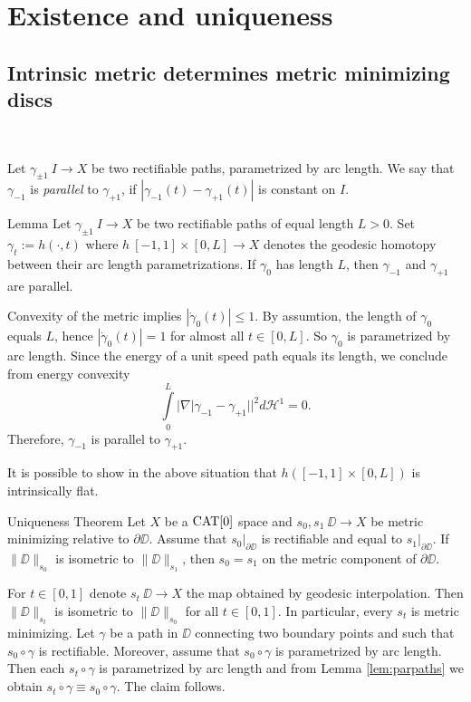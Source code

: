 \documentclass[a4paper,10pt]{amsart}
\begin{document}
\section{Existence and uniqueness}




\subsection{Intrinsic metric determines metric minimizing discs}~

\medskip
Let $\gamma_{\pm 1}\:I\to X$ be two rectifiable paths, parametrized by arc length. We say that  $\gamma_{-1}$ is {\em parallel} to $\gamma_{+1}$, if $|\gamma_{-1}(t)-\gamma_{+1}(t)|$
is constant on $I$.


\begin{thm}{Lemma}\label{lem:parpaths}
Let $\gamma_{\pm 1}\:I\to X$ be two rectifiable paths of equal length $L>0$. Set $\gamma_t:=h(\cdot,t)$ where $h\:[-1,1]\times[0,L]\to X$ denotes the geodesic homotopy
between their arc length parametrizations. If $\gamma_0$ has length $L$, then $\gamma_{-1}$ and $\gamma_{+1}$ are parallel. 
\end{thm}
Convexity of the metric implies $|\dot\gamma_0(t)|\leq 1$. By assumtion, the length of $\gamma_0$ equals $L$, hence $|\dot\gamma_0(t)|=1$ for almost all $t\in[0,L]$. So $\gamma_0$
is parametrized by arc length. Since the energy of a unit speed path equals its length, we conclude from energy convexity 
$$
\int\limits_0^L|\nabla |\gamma_{-1}-\gamma_{+1}||^2 d\mathcal{H}^1
=
0.
$$
Therefore, $\gamma_{-1}$ is parallel to $\gamma_{+1}$.
\qeds

It is possible to show in the above situation that  $h([-1,1]\times[0,L])$ is intrinsically flat.


\begin{thm}{Uniqueness Theorem}\label{prop:strict-mm}
Let $X$ be a $\mathop{\rm CAT}\nolimits[0]$ space and $s_0, s_1\:\DD\to X$ be metric minimizing relative to $\partial\DD$. Assume that 
$s_0|_{\partial \DD}$ is rectifiable and equal to $s_1|_{\partial \DD}$. If 
$\|\DD\|_{s_0}$ is isometric to $\|\DD\|_{s_1}$, then $s_0=s_1$ on the metric component of $\partial\DD$.
\end{thm}

For $t\in[0,1]$ denote $s_t\:\DD\to X$ the map obtained by geodesic interpolation. Then
$\|\DD\|_{s_t}$ is isometric to $\|\DD\|_{s_0}$ for all $t\in[0,1]$. In particular, every $s_t$ is metric minimizing.
Let $\gamma$ be a path in $\DD$ connecting two boundary points and such that $s_0\circ\gamma$ is rectifiable.
Moreover, assume that $s_0\circ\gamma$ is parametrized by arc length. 
Then each 
$s_t\circ\gamma$ is parametrized by arc length and from Lemma \ref{lem:parpaths} we obtain $s_t\circ\gamma\equiv s_0\circ\gamma$.
The claim follows.
\qeds
\end{document}
